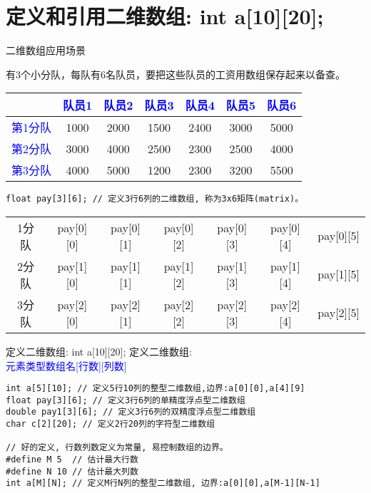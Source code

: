


\section{定义和引用二维数组: int a[10][20];}

\begin{frame}{二维数组应用场景}
\vspace{-0.3cm}
\begin{example}
	有3个小分队，每队有6名队员，要把这些队员的工资用数组保存起来以备查。
	\begin{tabular}{|c|c|c|c|c|c|c|}
		\hline 
	     & \textcolor{blue}{队员1} & \textcolor{blue}{队员2} & \textcolor{blue}{队员3} & \textcolor{blue}{队员4} & \textcolor{blue}{队员5} & \textcolor{blue}{队员6}\\
	    \hline  
	    \textcolor{blue}{第1分队}& 1000 & 2000 & 1500 & 2400 & 3000 & 5000\\ 
		\hline 
		\textcolor{blue}{第2分队}& 3000 & 4000 & 2500 & 2300 & 2500 & 4000\\ 
		\hline 
		\textcolor{blue}{第3分队}& 4000 & 5000 & 1200 & 2300 & 3200 & 5500\\ 
		\hline 
	\end{tabular} 
\end{example}
\begin{lstlisting}
float pay[3][6]; // 定义3行6列的二维数组, 称为3x6矩阵(matrix)。
\end{lstlisting}
\begin{tabular}{c|c|c|c|c|c|c|}
	\cline{2-7}  
	1分队 & pay[0][0] & pay[0][1] & pay[0][2] & pay[0][3] & pay[0][4] & pay[0][5] \\ 
	\cline{2-7}   
	2分队& pay[1][0] & pay[1][1] & pay[1][2] & pay[1][3] & pay[1][4] & pay[1][5] \\ 
	\cline{2-7}   
	3分队 & pay[2][0] & pay[2][1] & pay[2][2] & pay[2][3] & pay[2][4] & pay[2][5] \\ 
	\cline{2-7}  
\end{tabular} 
\end{frame}

\begin{frame}{定义二维数组: int a[10][20];}
定义二维数组: \\
\textcolor{blue}{元素类型\quad 数组名[行数][列数]}
\begin{lstlisting}
int a[5][10]; // 定义5行10列的整型二维数组,边界:a[0][0],a[4][9]
float pay[3][6]; // 定义3行6列的单精度浮点型二维数组
double pay1[3][6]; // 定义3行6列的双精度浮点型二维数组
char c[2][20]; // 定义2行20列的字符型二维数组

// 好的定义, 行数列数定义为常量, 易控制数组的边界。
#define M 5  // 估计最大行数
#define N 10 // 估计最大列数
int a[M][N]; // 定义M行N列的整型二维数组, 边界:a[0][0],a[M-1][N-1]
\end{lstlisting}
\end{frame}

